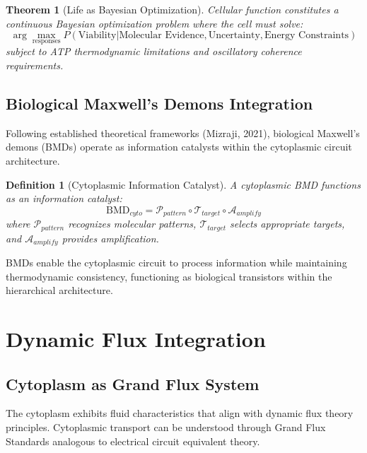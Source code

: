 \documentclass[12pt,a4paper]{article}
\newtheorem{theorem}{Theorem}
\newtheorem{definition}{Definition}
\begin{document}
\begin{theorem}[Life as Bayesian Optimization]
Cellular function constitutes a continuous Bayesian optimization problem where the cell must solve:
\begin{equation}
\arg\max_{\text{responses}} P(\text{Viability} | \text{Molecular Evidence}, \text{Uncertainty}, \text{Energy Constraints})
\end{equation}
subject to ATP thermodynamic limitations and oscillatory coherence requirements.
\end{theorem}

\subsection{Biological Maxwell's Demons Integration}

Following established theoretical frameworks (Mizraji, 2021), biological Maxwell's demons (BMDs) operate as information catalysts within the cytoplasmic circuit architecture.

\begin{definition}[Cytoplasmic Information Catalyst]
A cytoplasmic BMD functions as an information catalyst:
\begin{equation}
\text{BMD}_{cyto} = \mathcal{P}_{pattern} \circ \mathcal{T}_{target} \circ \mathcal{A}_{amplify}
\end{equation}
where $\mathcal{P}_{pattern}$ recognizes molecular patterns, $\mathcal{T}_{target}$ selects appropriate targets, and $\mathcal{A}_{amplify}$ provides amplification.
\end{definition}

BMDs enable the cytoplasmic circuit to process information while maintaining thermodynamic consistency, functioning as biological transistors within the hierarchical architecture.

\section{Dynamic Flux Integration}

\subsection{Cytoplasm as Grand Flux System}

The cytoplasm exhibits fluid characteristics that align with dynamic flux theory principles. Cytoplasmic transport can be understood through Grand Flux Standards analogous to electrical circuit equivalent theory.
\end{document}
